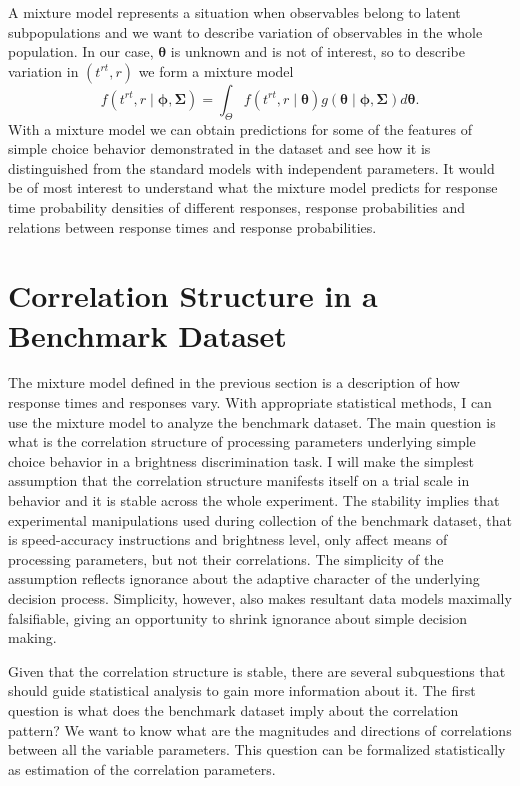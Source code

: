 \documentclass[12pt]{report}
\begin{document}
A mixture model represents a situation when observables belong to latent subpopulations and we want to describe variation of observables in the whole population. In our case, $\boldsymbol{\theta}$ is unknown and is not of interest, so to describe variation in $(t^{rt},r)$ we form a mixture model
%
\begin{equation}
f(t^{rt},r \mid \boldsymbol{\phi}, \boldsymbol{\Sigma}) = \int_{\Theta} f(t^{rt},r \mid \boldsymbol{\theta})g(\boldsymbol{\theta} \mid \boldsymbol{\phi}, \boldsymbol{\Sigma})d\boldsymbol{\theta}.
\end{equation}
With a mixture model we can obtain predictions for some of the features of simple choice behavior demonstrated in the \citet{RatRou1998} dataset and see how it is distinguished from the standard models with independent parameters. It would be of most interest to understand what the mixture model predicts for response time probability densities of different responses, response probabilities and relations between response times and response probabilities.

\section{Correlation Structure in a Benchmark Dataset}

The mixture model defined in the previous section is a description of how response times and responses vary. With appropriate statistical methods, I can use the mixture model to analyze the \cite{RatRou1998} benchmark dataset. The main question is what is the correlation structure of processing parameters underlying simple choice behavior in a brightness discrimination task. I will make the simplest assumption that the correlation structure manifests itself on a trial scale in behavior and it is stable across the whole experiment. The stability implies that experimental manipulations used during collection of the benchmark dataset, that is speed-accuracy instructions and brightness level, only affect means of processing parameters, but not their correlations. The simplicity of the assumption reflects ignorance about the adaptive character of the underlying decision process. Simplicity, however, also makes resultant data models maximally falsifiable, giving an opportunity to shrink ignorance about simple decision making.

Given that the correlation structure is stable, there are several subquestions that should guide statistical analysis to gain more information about it. The first question is what does the benchmark dataset imply about the correlation pattern? We want to know what are the magnitudes and directions of correlations between all the variable parameters. This question can be formalized statistically as estimation of the correlation parameters.
\end{document}
